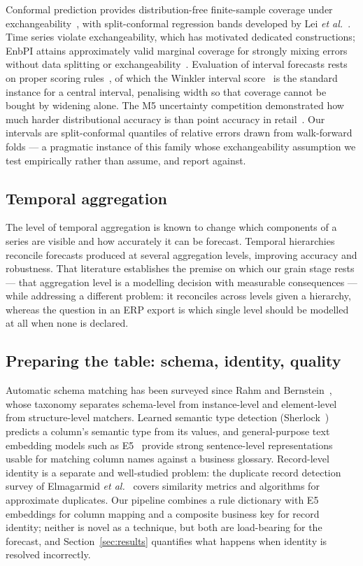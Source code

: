 \documentclass[conference]{IEEEtran}
\begin{document}
Conformal prediction provides distribution-free finite-sample coverage under
exchangeability~\cite{vovk2005conformal}, with split-conformal regression
bands developed by Lei \emph{et al.}~\cite{lei2018distfree}. Time series
violate exchangeability, which has motivated dedicated constructions; EnbPI
attains approximately valid marginal coverage for strongly mixing errors
without data splitting or exchangeability~\cite{xu2021enbpi}. Evaluation of
interval forecasts rests on proper scoring
rules~\cite{gneiting2007scoring}, of which the Winkler interval
score~\cite{winkler1972interval} is the standard instance for a central
interval, penalising width so that coverage cannot be bought by widening
alone. The M5 uncertainty competition demonstrated how much harder
distributional accuracy is than point accuracy in
retail~\cite{makridakis2022m5unc}. Our intervals are split-conformal quantiles
of relative errors drawn from walk-forward folds --- a pragmatic instance of
this family whose exchangeability assumption we test empirically rather than
assume, and report against.

\subsection{Temporal aggregation}

The level of temporal aggregation is known to change which components of a
series are visible and how accurately it can be forecast. Temporal
hierarchies~\cite{athanasopoulos2017temporal} reconcile forecasts produced at
several aggregation levels, improving accuracy and robustness. That literature
establishes the premise on which our grain stage rests --- that aggregation
level is a modelling decision with measurable consequences --- while
addressing a different problem: it reconciles across levels given a
hierarchy, whereas the question in an ERP export is which single level should
be modelled at all when none is declared.

\subsection{Preparing the table: schema, identity, quality}

Automatic schema matching has been surveyed since Rahm and
Bernstein~\cite{rahm2001schema}, whose taxonomy separates schema-level from
instance-level and element-level from structure-level matchers. Learned
semantic type detection (Sherlock~\cite{hulsebos2019sherlock}) predicts a
column's semantic type from its values, and general-purpose text embedding
models such as E5~\cite{wang2022e5} provide strong sentence-level
representations usable for matching column names against a business glossary.
Record-level identity is a separate and well-studied problem: the duplicate
record detection survey of Elmagarmid
\emph{et al.}~\cite{elmagarmid2007duplicate} covers similarity metrics and
algorithms for approximate duplicates. Our pipeline combines a rule
dictionary with E5 embeddings for column mapping and a composite business key
for record identity; neither is novel as a technique, but both are load-bearing
for the forecast, and Section~\ref{sec:results} quantifies what happens when
identity is resolved incorrectly.
\end{document}
